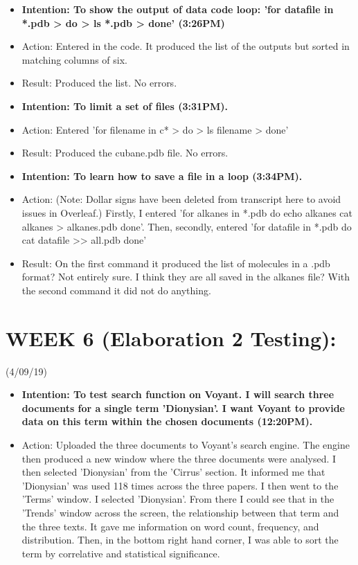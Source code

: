 \documentclass[a4paper,12pt]{article}
\begin{document}
\begin{itemize}
\begin{itemize}
\item \textbf {Intention: To show the output of data code loop: 'for datafile in *.pdb
> do
>    ls *.pdb
> done' (3:26PM)}

\item Action: Entered in the code. It produced the list of the outputs but sorted in matching columns of six. 

\item Result: Produced the list. No errors.

\item \textbf {Intention: To limit a set of files (3:31PM).}

\item Action: Entered 'for filename in c*
> do
>    ls filename
> done'

\item Result: Produced the cubane.pdb file. No errors.

\item \textbf{Intention: To learn how to save a file in a loop (3:34PM).}

\item Action: (Note: Dollar signs have been deleted from transcript here to avoid issues in Overleaf.) Firstly, I entered 'for alkanes in *.pdb
do
    echo alkanes
    cat alkanes > alkanes.pdb
done'. Then, secondly, entered 'for datafile in *.pdb
do
    cat datafile >> all.pdb
done'

\item Result: On the first command it produced the list of molecules in a .pdb format? Not entirely sure. I think they are all saved in the alkanes file? With the second command it did not do anything. 


\end{itemize}

\section{WEEK 6 (Elaboration 2 Testing):}

(4/09/19)

\begin{itemize}

\item \textbf {Intention: To test search function on Voyant. I will search three documents for a single term 'Dionysian'. I want Voyant to provide data on this term within the chosen documents (12:20PM).} 

\item Action: Uploaded the three documents to Voyant's search engine. The engine then produced a new window where the three documents were analysed. I then selected 'Dionysian' from the 'Cirrus' section. It informed me that 'Dionysian' was used 118 times across the three papers. I then went to the 'Terms' window. I selected 'Dionysian'. From there I could see that in the 'Trends' window across the screen, the relationship between that term and the three texts. It gave me information on word count, frequency, and distribution. Then, in the bottom right hand corner, I was able to sort the term by correlative and statistical significance. 


\end{itemize}
\end{itemize}
\end{document}
